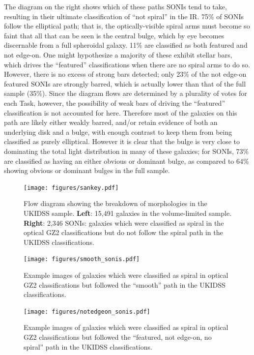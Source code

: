 The diagram on the right shows which of these paths SONIs tend to take, resulting in their ultimate classification of ``not spiral'' in the IR. 75\% of SONIs follow the elliptical path; that is, the optically-visible spiral arms must become so faint that all that can be seen is the central bulge, which by eye becomes discernable from a full spheroidal galaxy. 11\% are classified as both featured and not edge-on. One might hypothesize a majority of these exhibit stellar bars, which drives the ``featured'' classifications when there are no spiral arms to do so. However, there is no excess of strong bars detected; only 23\% of the not edge-on featured SONIs are strongly barred, which is actually lower than that of the full sample (35\%). Since the diagram flows are determined by a plurality of votes for each Task, however, the possibility of weak bars of driving the ``featured'' classification is not accounted for here. Therefore most of the galaxies on this path are likely either weakly barred, and/or retain evidence of both an underlying disk and a bulge, with enough contrast to keep them from being classified as purely elliptical. However it is clear that the bulge is very close to dominating the total light distribution in many of these galaxies; for SONIs, 73\% are classified as having an either obvious or dominant bulge, as compared to 64\% showing obvious or dominant bulges in the full sample. 



\begin{figure}
\centering
\texttt{[image: figures/sankey.pdf]}
\caption{Flow diagram showing the breakdown of morphologies in the UKIDSS sample. \textbf{Left}: 15,491 galaxies in the volume-limited sample. \textbf{Right}: 2,346 SONIs: galaxies which were classified as spiral in the optical GZ2 classifications but do not follow the spiral path in the UKIDSS classifications.}
\label{fig:sankey}
\end{figure}

\begin{figure}
\centering
\texttt{[image: figures/smooth\_sonis.pdf]}
\caption{Example images of galaxies which were classified as spiral in optical GZ2 classifications but followed the ``smooth'' path in the UKIDSS classifications.}
\label{fig:smooth}
\end{figure}

\begin{figure}
\centering
\texttt{[image: figures/notedgeon\_sonis.pdf]}
\caption{Example images of galaxies which were classified as spiral in optical GZ2 classifications but followed the ``featured, not edge-on, no spiral'' path in the UKIDSS classifications.}
\label{fig:notedgeon}
\end{figure}

